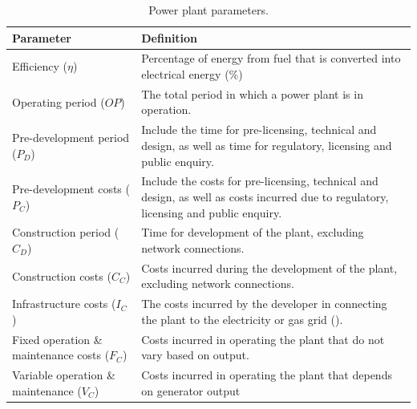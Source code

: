 \begin{table}[]
	\begin{tabular}{p{5cm}p{10cm}}
		\toprule
		Parameter                                    & Definition                                                                                                                            \\ \midrule
		Efficiency ($\eta$)                          & Percentage of energy from fuel that is converted into electrical energy (\%)                                                          \\
		Operating period ($OP$)                      & The total period in which a power plant is in operation.                                                                              \\
		Pre-development period ($P_D$)               & Include the time for pre-licensing, technical and design, as well as time for regulatory, licensing and public enquiry.               \\
		Pre-development costs ($P_C$)                & Include the costs for pre-licensing, technical and design, as well as costs incurred due to regulatory, licensing and public enquiry. \\
		Construction period ($C_D$)                  & Time for development of the plant, excluding network connections.                                                                     \\
		Construction costs ($C_C$)                   & Costs incurred during the development of the plant, excluding network connections.                                                    \\
		Infrastructure costs ($I_C$)                 & The costs incurred by the developer in connecting the plant to the electricity or gas grid (\textsterling).                           \\
		Fixed operation \& maintenance costs ($F_C$) & Costs incurred in operating the plant that do not vary based on output.                                                               \\
		Variable operation \& maintenance ($V_C$)    & Costs incurred in operating the plant that depends on generator output                                                                \\ \bottomrule
	\end{tabular}
	\caption{Power plant parameters.}
	\label{table:cost_parameters}
\end{table}




